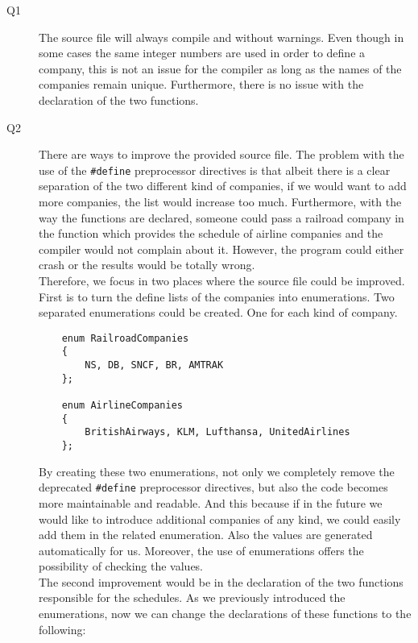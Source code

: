\documentclass[a4paper]{article}
\newcounter{exerciseCount}
\newcommand{\exercise}[1]{\addtocounter{exerciseCount}{1} \noindent \medskip {\large \textsf{\textbf{Exercise \arabic{exerciseCount} #1}}} \par}
\begin{document}
\exercise{}

\begin{description}
	\item[Q1]\-
	The source file will always compile and without warnings. Even though in some cases the same integer numbers are used in order to define a company, this is not an issue for the compiler as long as the names of the companies remain unique. Furthermore, there is no issue with the declaration of the two functions.
	\item[Q2]\-
	There are ways to improve the provided source file. The problem with the use of the \verb|#define| preprocessor directives is that albeit there is a clear separation of the two different kind of companies, if we would want to add more companies, the list would increase too much. Furthermore, with the way the functions are declared, someone could pass a railroad company in the function which provides the schedule of airline companies and the compiler would not complain about it. However, the program could either crash or the results would be totally wrong.\\
	
	Therefore, we focus in two places where the source file could be improved. First is to turn the define lists of the companies into enumerations. Two separated enumerations could be created. One for each kind of company.
	
	\begin{verbatim}
	enum RailroadCompanies
	{
	    NS, DB, SNCF, BR, AMTRAK
	};
	
	enum AirlineCompanies
	{
	    BritishAirways, KLM, Lufthansa, UnitedAirlines
	};
	\end{verbatim}
	
	By creating these two enumerations, not only we completely remove the deprecated \verb|#define| preprocessor directives, but also the code becomes more maintainable and readable. And this because if in the future we would like to introduce additional companies of any kind, we could easily add them in the related enumeration. Also the values are generated automatically for us. Moreover, the use of enumerations offers the possibility of checking the values.\\
	
	The second improvement would be in the declaration of the two functions responsible for the schedules. As we previously introduced the enumerations, now we can change the declarations of these functions to the following:
	

\end{description}
\end{document}
